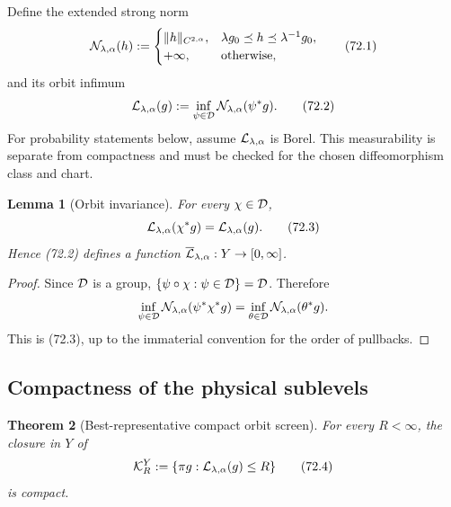 \documentclass[11pt]{article}
\newtheorem{theorem}{Theorem}[section]
\newtheorem{lemma}[theorem]{Lemma}
\theoremstyle{remark}
\begin{document}
Define the extended strong norm
\begin{equation}
 {\cal N}_{\lambda,\alpha}(h)
 :=
 \begin{cases}
  \|h\|_{C^{2,\alpha}},&
  \lambda g_0\preceq h\preceq\lambda^{-1}g_0,\\
  +\infty,&\text{otherwise},
 \end{cases}                                                \tag{72.1}
\end{equation}
and its orbit infimum
\begin{equation}
 {\cal L}_{\lambda,\alpha}(g)
 :=
 \inf_{\psi\in{\cal D}}
 {\cal N}_{\lambda,\alpha}(\psi^*g).                         \tag{72.2}
\end{equation}
For probability statements below, assume
\({\cal L}_{\lambda,\alpha}\) is Borel.  This measurability is
separate from compactness and must be checked for the chosen
diffeomorphism class and chart.

\begin{lemma}[Orbit invariance]
\label{lem:v12v72-invariance}
For every \(\chi\in{\cal D}\),
\begin{equation}
 {\cal L}_{\lambda,\alpha}(\chi^*g)
 ={\cal L}_{\lambda,\alpha}(g).                              \tag{72.3}
\end{equation}
Hence (72.2) defines a function
\(\overline{\cal L}_{\lambda,\alpha}:Y\to[0,\infty]\).
\end{lemma}

\begin{proof}
Since \({\cal D}\) is a group,
\(\{\psi\circ\chi:\psi\in{\cal D}\}={\cal D}\).  Therefore
\[
 \inf_{\psi\in{\cal D}}
 {\cal N}_{\lambda,\alpha}(\psi^*\chi^*g)
 =
 \inf_{\theta\in{\cal D}}
 {\cal N}_{\lambda,\alpha}(\theta^*g).
\]
This is (72.3), up to the immaterial convention for the order of
pullbacks.
\end{proof}

\subsection{Compactness of the physical sublevels}

\begin{theorem}[Best-representative compact orbit screen]
\label{thm:v12v72-compact-orbit}
For every \(R<\infty\), the closure in \(Y\) of
\begin{equation}
 {\cal K}_R^Y
 :=
 \{\pi g:{\cal L}_{\lambda,\alpha}(g)\leq R\}                \tag{72.4}
\end{equation}
is compact.
\end{theorem}
\end{document}
